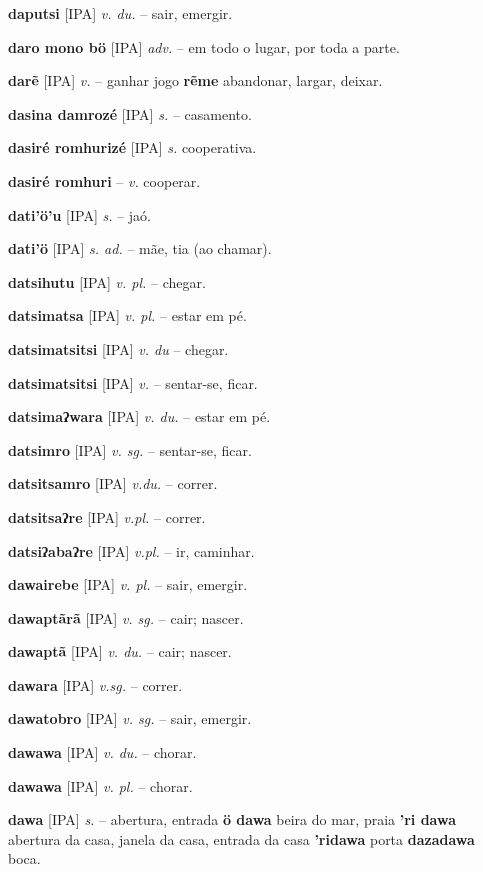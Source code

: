 \textbf{daputsi} [IPA] \textit{v. du.} -- sair, emergir.

\textbf{daro mono bö} [IPA] \textit{adv.} -- em todo o lugar, por toda a parte.

\textbf{darẽ} [IPA] \textit{v.} -- ganhar jogo  \textbf{rẽme} abandonar, largar, deixar.

\textbf{dasina damrozé} [IPA] \textit{s.} -- casamento.

\textbf{dasiré romhurizé} [IPA] \textit{s.} cooperativa.

\textbf{dasiré romhuri} -- \textit{v.} cooperar.

\textbf{dati'ö'u} [IPA] \textit{s.} -- jaó.

\textbf{dati'ö} [IPA] \textit{s. ad.} -- mãe, tia (ao chamar).

\textbf{datsihutu} [IPA] \textit{v. pl.} -- chegar.

\textbf{datsimatsa} [IPA] \textit{v. pl.} -- estar em pé.

\textbf{datsimatsitsi} [IPA] \textit{v. du} -- chegar.

\textbf{datsimatsitsi} [IPA] \textit{v.} -- sentar-se, ficar.

\textbf{datsimaʔwara} [IPA] \textit{v. du.} -- estar em pé.

\textbf{datsimro} [IPA] \textit{v. sg.} -- sentar-se, ficar.

\textbf{datsitsamro} [IPA] \textit{v.du.} -- correr.

\textbf{datsitsaʔre} [IPA] \textit{v.pl.} -- correr.

\textbf{datsiʔabaʔre} [IPA] \textit{v.pl.} -- ir, caminhar.

\textbf{dawairebe} [IPA] \textit{v. pl.} -- sair, emergir.

\textbf{dawaptãrã} [IPA] \textit{v. sg.} -- cair; nascer.

\textbf{dawaptã} [IPA] \textit{v. du.} -- cair; nascer.

\textbf{dawara} [IPA] \textit{v.sg.} -- correr.

\textbf{dawatobro} [IPA] \textit{v. sg.} -- sair, emergir.

\textbf{dawawa} [IPA] \textit{v. du.} -- chorar.

\textbf{dawawa} [IPA] \textit{v. pl.} -- chorar.

\textbf{dawa} [IPA] \textit{s.} -- abertura, entrada  \textbf{ö dawa} beira do mar, praia  \textbf{'ri dawa} abertura da casa, janela da casa, entrada da casa  \textbf{'ridawa} porta  \textbf{dazadawa} boca.

